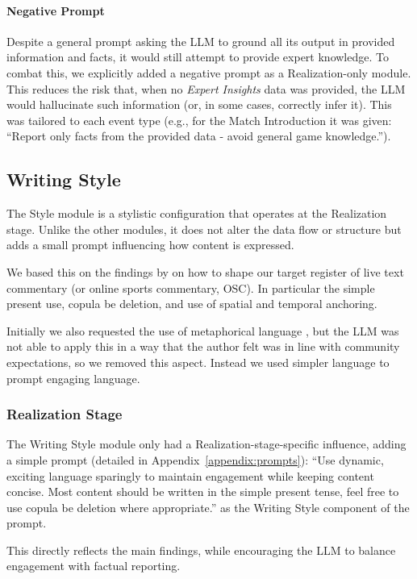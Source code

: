 \paragraph{Negative Prompt}
Despite a general prompt asking the LLM to ground all its output in provided information and facts, it would still attempt to provide expert knowledge. To combat this, we explicitly added a negative prompt as a Realization-only module. This reduces the risk that, when no \textit{Expert Insights} data was provided, the LLM would hallucinate such information (or, in some cases, correctly infer it). This was tailored to each event type (e.g., for the Match Introduction it was given: ``Report only facts from the provided data - avoid general game knowledge.'').

\subsection{Writing Style}
The Style module is a stylistic configuration that operates at the Realization stage. Unlike the other modules, it does not alter the data flow or structure but adds a small prompt influencing how content is expressed.

We based this on the findings by \citet{lewandowski2012} on how to shape our target register of live text commentary (or online sports commentary, OSC). In particular the simple present use, copula be deletion, and use of spatial and temporal anchoring.

Initially we also requested the use of metaphorical language \cite{byro2017, gustin2020}, but the LLM was not able to apply this in a way that the author felt was in line with community expectations, so we removed this aspect. Instead we used simpler language to prompt engaging language.

\subsubsection{Realization Stage}
The Writing Style module only had a Realization-stage-specific influence, adding a simple prompt (detailed in Appendix~\ref{appendix:prompts}):
``Use dynamic, exciting language sparingly to maintain engagement while keeping content concise. Most content should be written in the simple present tense, feel free to use copula be deletion where appropriate.'' as the Writing Style component of the prompt.

This directly reflects the main findings, while encouraging the LLM to balance engagement with factual reporting.

